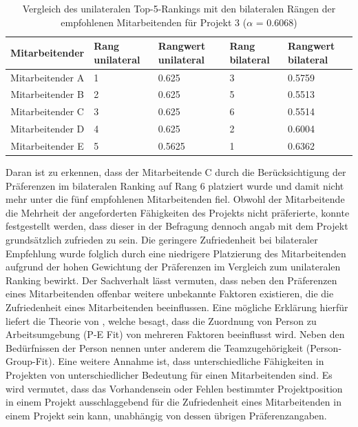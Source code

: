 \begin{table}[htbp]
    \begin{center}
    \begin{tabular}{c|p{0.7in}|p{0.7in}|p{0.7in}|p{0.7in}}
    {\textbf{Mitarbeitender}} & {\textbf{Rang unilateral}} & {\textbf{Rangwert unilateral}} & {\textbf{Rang bilateral}} & {\textbf{Rangwert bilateral}} \\
    \hline
	Mitarbeitender A & \hfil1 & \hfil0.625 & \hfil3 & \hfil0.5759 \\
    \hline
    Mitarbeitender B & \hfil2 & \hfil0.625 & \hfil5 & \hfil0.5513 \\
    \hline
	Mitarbeitender C & \hfil3 & \hfil0.625 & \hfil6 & \hfil0.5514 \\
    \hline
	Mitarbeitender D & \hfil4 & \hfil0.625 & \hfil2 & \hfil0.6004 \\
    \hline
	Mitarbeitender E & \hfil5 & \hfil0.5625 & \hfil1 & \hfil0.6362 \\
    \end{tabular}
    \end{center}
    \caption[Vergleich des unilateralen Top-5-Rankings mit den bilateralen Rängen der empfohlenen Mitarbeitenden für Projekt 3 ($\alpha$ = 0.6068)]{Vergleich des unilateralen Top-5-Rankings mit den bilateralen Rängen der empfohlenen Mitarbeitenden für Projekt 3 ($\alpha$ = 0.6068)}
	\label{tab:diskussion:tab1}
\end{table}

Daran ist zu erkennen, dass der Mitarbeitende C durch die Berücksichtigung der Präferenzen im bilateralen Ranking auf Rang 6 platziert wurde und damit nicht mehr unter die fünf empfohlenen Mitarbeitenden fiel.
Obwohl der Mitarbeitende die Mehrheit der angeforderten Fähigkeiten des Projekts nicht präferierte, konnte festgestellt werden, dass dieser in der Befragung dennoch angab mit dem Projekt grundsätzlich zufrieden zu sein.
Die geringere Zufriedenheit bei bilateraler Empfehlung wurde folglich durch eine niedrigere Platzierung des Mitarbeitenden aufgrund der hohen Gewichtung der Präferenzen im Vergleich zum unilateralen Ranking bewirkt.
Der Sachverhalt lässt vermuten, dass neben den Präferenzen eines Mitarbeitenden offenbar weitere unbekannte Faktoren existieren, die die Zufriedenheit eines Mitarbeitenden beeinflussen.
Eine mögliche Erklärung hierfür liefert die Theorie von \textcite[S. 1ff.]{malinowski:2006}, welche besagt, dass die Zuordnung von Person zu Arbeitsumgebung (\ac{P-E Fit}) von mehreren Faktoren beeinflusst wird.
Neben den Bedürfnissen der Person nennen \textcite[S. 1ff.]{malinowski:2006} unter anderem die Teamzugehörigkeit (Person-Group-Fit).
Eine weitere Annahme ist, dass unterschiedliche Fähigkeiten in Projekten von unterschiedlicher Bedeutung für einen Mitarbeitenden sind.
Es wird vermutet, dass das Vorhandensein oder Fehlen bestimmter Projektposition in einem Projekt ausschlaggebend für die Zufriedenheit eines Mitarbeitenden in einem Projekt sein kann, unabhängig von dessen übrigen Präferenzangaben.


